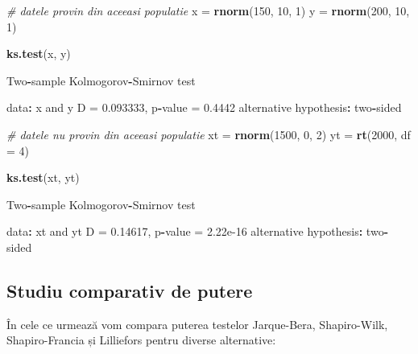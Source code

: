 \documentclass[]{article}
\newenvironment{Shaded}{\begin{snugshade}}{\end{snugshade}}
\newcommand{\KeywordTok}[1]{\textcolor[rgb]{0.13,0.29,0.53}{\textbf{#1}}}
\newcommand{\DataTypeTok}[1]{\textcolor[rgb]{0.13,0.29,0.53}{#1}}
\newcommand{\DecValTok}[1]{\textcolor[rgb]{0.00,0.00,0.81}{#1}}
\newcommand{\FloatTok}[1]{\textcolor[rgb]{0.00,0.00,0.81}{#1}}
\newcommand{\StringTok}[1]{\textcolor[rgb]{0.31,0.60,0.02}{#1}}
\newcommand{\CommentTok}[1]{\textcolor[rgb]{0.56,0.35,0.01}{\textit{#1}}}
\newcommand{\OperatorTok}[1]{\textcolor[rgb]{0.81,0.36,0.00}{\textbf{#1}}}
\newcommand{\NormalTok}[1]{#1}
\begin{document}
\begin{Shaded}
\begin{Highlighting}[]
\CommentTok{# datele provin din aceeasi populatie}
\NormalTok{x =}\StringTok{ }\KeywordTok{rnorm}\NormalTok{(}\DecValTok{150}\NormalTok{, }\DecValTok{10}\NormalTok{, }\DecValTok{1}\NormalTok{)}
\NormalTok{y =}\StringTok{ }\KeywordTok{rnorm}\NormalTok{(}\DecValTok{200}\NormalTok{, }\DecValTok{10}\NormalTok{, }\DecValTok{1}\NormalTok{)}

\KeywordTok{ks.test}\NormalTok{(x, y)}

\NormalTok{    Two}\OperatorTok{-}\NormalTok{sample Kolmogorov}\OperatorTok{-}\NormalTok{Smirnov test}

\NormalTok{data}\OperatorTok{:}\StringTok{  }\NormalTok{x and y}
\NormalTok{D =}\StringTok{ }\FloatTok{0.093333}\NormalTok{, p}\OperatorTok{-}\NormalTok{value =}\StringTok{ }\FloatTok{0.4442}
\NormalTok{alternative hypothesis}\OperatorTok{:}\StringTok{ }\NormalTok{two}\OperatorTok{-}\NormalTok{sided}

\CommentTok{# datele nu provin din aceeasi populatie}
\NormalTok{xt =}\StringTok{ }\KeywordTok{rnorm}\NormalTok{(}\DecValTok{1500}\NormalTok{, }\DecValTok{0}\NormalTok{, }\DecValTok{2}\NormalTok{)}
\NormalTok{yt =}\StringTok{ }\KeywordTok{rt}\NormalTok{(}\DecValTok{2000}\NormalTok{, }\DataTypeTok{df =} \DecValTok{4}\NormalTok{)}

\KeywordTok{ks.test}\NormalTok{(xt, yt)}

\NormalTok{    Two}\OperatorTok{-}\NormalTok{sample Kolmogorov}\OperatorTok{-}\NormalTok{Smirnov test}

\NormalTok{data}\OperatorTok{:}\StringTok{  }\NormalTok{xt and yt}
\NormalTok{D =}\StringTok{ }\FloatTok{0.14617}\NormalTok{, p}\OperatorTok{-}\NormalTok{value =}\StringTok{ }\FloatTok{2.22e-16}
\NormalTok{alternative hypothesis}\OperatorTok{:}\StringTok{ }\NormalTok{two}\OperatorTok{-}\NormalTok{sided}
\end{Highlighting}
\end{Shaded}

\subsection{Studiu comparativ de
putere}\label{studiu-comparativ-de-putere}

În cele ce urmează vom compara puterea testelor Jarque-Bera,
Shapiro-Wilk, Shapiro-Francia și Lilliefors pentru diverse alternative:
\end{document}
